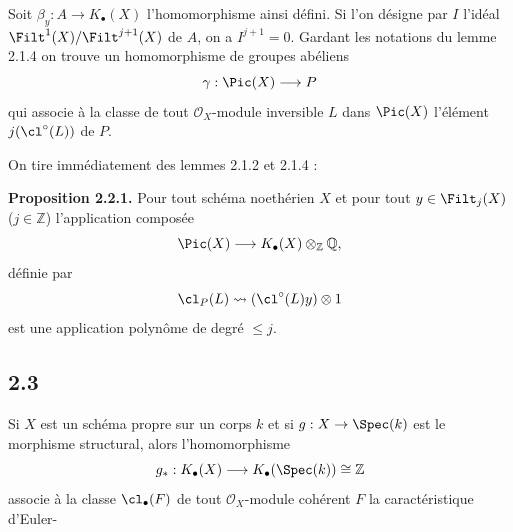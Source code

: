Soit $\beta_y:A\to K_\bullet(X)$ l'homomorphisme ainsi défini. Si l'on désigne par $I$ l'idéal $\Filt^1(X)/\Filt^{j+1}(X)$ de $A$, on a $I^{j+1}=0$. Gardant les notations du lemme 2.1.4 on trouve un homomorphisme de groupes abéliens
\[
\gamma:\Pic(X)\longrightarrow P
\]
qui associe à la classe de tout $\mathcal O_X$-module inversible $L$ dans $\Pic(X)$ l'élément $j(\cl^\circ(L))$ de $P$.

On tire immédiatement des lemmes 2.1.2 et 2.1.4 :

\textbf{Proposition 2.2.1.} Pour tout schéma noethérien $X$ et pour tout $y\in\Filt_j(X)$ ($j\in\mathbb Z$) l'application composée
\[
\Pic(X)\longrightarrow K_\bullet(X)\otimes_{\mathbb Z}\mathbb Q,
\]
définie par
\[
\cl_P(L)\rightsquigarrow (\cl^\circ(L)y)\otimes1
\]
est une application polynôme de degré $\leq j$.

\subsection*{2.3}
Si $X$ est un schéma propre sur un corps $k$ et si $g:X\to\Spec(k)$ est le morphisme structural, alors l'homomorphisme
\[
g_*:K_\bullet(X)\longrightarrow K_\bullet(\Spec(k))\cong\mathbb Z
\]
associe à la classe $\cl_\bullet(F)$ de tout $\mathcal O_X$-module cohérent $F$ la caractéristique d'Euler-
